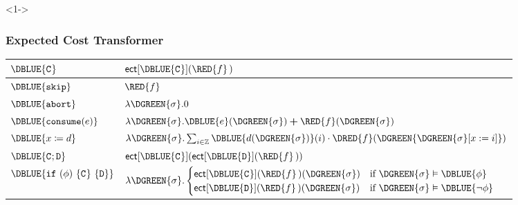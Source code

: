 \documentclass[
11pt,
usepdftitle=false,
aspectratio=169,
xcolor={table,usenames,dvipsnames},
]{beamer}
\begin{document}
\begin{frame}<1->
  \frametitle{Expected Cost Transformer}
    {\begin{center}
      \renewcommand{\st}{\DGREEN{\sigma}}
      \begin{tabular}{l@{\quad}l}
        \toprule
        $\DBLUE{\cmd}$ & $\ect{\DBLUE{\cmd}}(\RED{f}\,)$  \\
        \midrule
        $\DBLUE{\skipc}$                     & $\RED{f}$                                                                           \\[1mm]
        $\DBLUE{\haltc}$                     & $\lambda \st. 0$                                                                      \\[1mm]
        $\DBLUE{\tickc{\exp}}$               & $\lambda \st. \DBLUE{\exp}(\st) \plusf \RED{f}(\st)$ \\[1mm]
        $\DBLUE{x \passign \expd}$           & $\lambda \st. \sum_{i \in \Z} \DBLUE{\expd(\st)}(i) \cdot \DRED{f}(\DGREEN{\upd{\st}{x}{i}})$      \\[1mm]
        $\DBLUE{\cmd; \cmdtwo}$              & $\ect{\DBLUE{\cmd}}(\ect{\DBLUE{\cmdtwo}}(\RED{f}\,))$                                                      \\[1mm]
        $\DBLUE{\ifc{\bexp}{\cmd}{\cmdtwo}}$ & $\lambda \st.
                                               \begin{cases}
                                                 \ect{\DBLUE{\cmd}}(\RED{f}\,)(\st) & \text{if $\st \entails \DBLUE{\bexp}$} \\
                                                 \ect{\DBLUE{\cmdtwo}}(\RED{f}\,)(\st) & \text{if $\st \entails \DBLUE{\neg \bexp}$}
                                               \end{cases}$\\[5mm]

\end{tabular}
\end{center}}
\end{frame}
\end{document}
